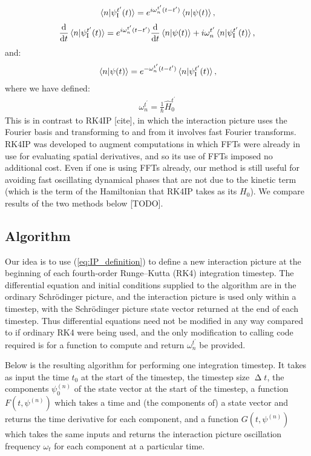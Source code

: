 \begin{align}\label{eq:IP_definition_components}
\braket{n}{\psi_{\mathrm{I}}^{t^\prime}(t)} = e^{ i \omega_n^{t^\prime}(t - t^\prime)}\braket{n}{\psi(t)},
\end{align}
\begin{align}\label{eq:IPDE_components}
\dv t \braket{n}{\psi_{\mathrm{I}}^{t^\prime}(t)}
    = e^{i \omega_n^{t^\prime}(t - t^\prime)}\dv t \braket{n}{\psi(t)}
      + i\omega_n^{t^\prime}\braket{n}{\psi_{\mathrm{I}}^{t^\prime}(t)},
\end{align}
and:
\begin{align}\label{eq:backtransform_components}
\braket{n}{\psi(t)} = e^{-\omega_n^{t^\prime}(t - t^\prime)}\braket{n}{\psi_{\mathrm{I}}^{t^\prime}(t)},
\end{align}
where we have defined:
\begin{align}\label{eq:omega}
\omega_n^{t^\prime} = \frac 1\hbar \hat H_0^{t^\prime}
\end{align}
This is in contrast to RK4IP [cite], in which the interaction picture uses the Fourier basis and transforming to and from it involves fast Fourier transforms. RK4IP was developed to augment computations in which FFTs were already in use for evaluating spatial derivatives, and so its use of FFTs imposed no additional cost. Even if one is using FFTs already, our method is still useful for avoiding fast oscillating dynamical phases that are not due to the kinetic term (which is the term of the Hamiltonian that RK4IP takes as its $H_0$). We compare results of the two methods below [TODO].

\subsection{Algorithm}
Our idea is to use (\ref{eq:IP_definition}) to define a new interaction picture at the beginning of each fourth-order Runge–Kutta (RK4) integration timestep. The differential equation and initial conditions supplied to the algorithm are in the ordinary Schrödinger picture, and the interaction picture is used only within a timestep, with the Schrödinger picture state vector returned at the end of each timestep. Thus differential equations need not be modified in any way compared to if ordinary RK4 were being used, and the only modification to calling code required is for a function to compute and return $\omega_n^{t^\prime}$ be provided.

Below is the resulting algorithm for performing one integration timestep. It takes as input the time $t_0$ at the start of the timestep, the timestep size $\upDelta t$, the components $\psi_0^{(n)}$ of the state vector at the start of the timestep, a function $F(t, \psi^{(n)})$ which takes a time and (the components of) a state vector and returns the time derivative for each component, and a function $G(t, \psi^{(n)})$ which takes the same inputs and returns the interaction picture oscillation frequency $\omega_{t}$ for each component at a particular time.


